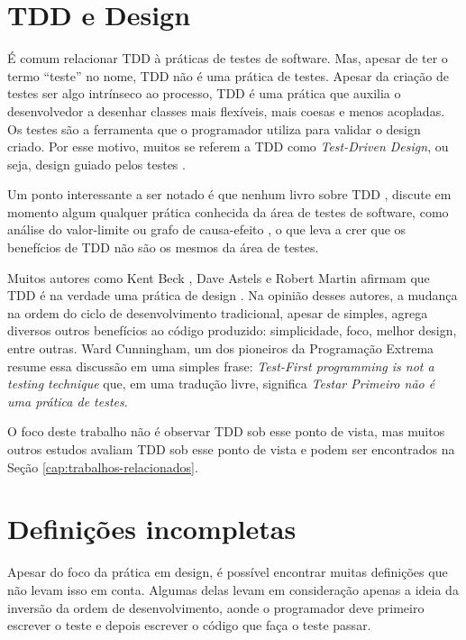 \section{TDD e Design}
\label{cap:tdd-e-design}

É comum relacionar TDD à práticas de testes de software. Mas, apesar de ter o
termo ``teste'' no nome, TDD não é uma prática de testes.
Apesar da criação de testes ser algo intrínseco ao processo, TDD é uma prática
que auxilia o desenvolvedor a desenhar classes mais flexíveis, mais coesas e
menos acopladas. Os testes são a ferramenta que o programador utiliza para
validar o design criado. Por esse motivo, muitos se referem a TDD como
\textit{Test-Driven Design}, ou seja, design guiado pelos testes
\cite{tdd-taxonomy}.

Um ponto interessante a ser notado é que nenhum livro sobre TDD \cite{GOOS}
\cite{TDDByExample} \cite{astels-tdd}, discute em momento algum qualquer
prática conhecida da área de testes de software, como análise do valor-limite ou
grafo de causa-efeito \cite{art-of-sw-testing}, o que leva a crer que os
benefícios de TDD não são os mesmos da área de testes.

Muitos autores como Kent Beck \cite{aim-fire}, Dave Astels \cite{astels-tdd} e
Robert Martin \cite{bob-martin} afirmam que TDD é na verdade uma prática de
design \cite{tdd-taxonomy} \cite{aim-fire}.
Na opinião desses autores, a mudança na ordem do ciclo de
desenvolvimento tradicional, apesar de simples, agrega diversos outros
benefícios ao código produzido: simplicidade, foco, melhor design, entre outras.
Ward Cunningham, um dos pioneiros da Programação Extrema resume essa discussão
em uma simples frase: \textit{Test-First programming is not a testing technique}
que, em uma tradução livre, significa \textit{Testar Primeiro não é uma prática 
de testes}.

O foco deste trabalho não é observar TDD sob esse ponto de vista, mas muitos
outros estudos avaliam TDD sob esse ponto de vista e podem ser encontrados na
Seção \ref{cap:trabalhos-relacionados}.

\section{Definições incompletas}

Apesar do foco da prática em design, é possível encontrar muitas definições que
não levam isso em conta. Algumas delas levam em consideração apenas a ideia da
inversão da ordem de desenvolvimento, aonde o programador deve primeiro escrever
o teste e depois escrever o código que faça o teste passar.

